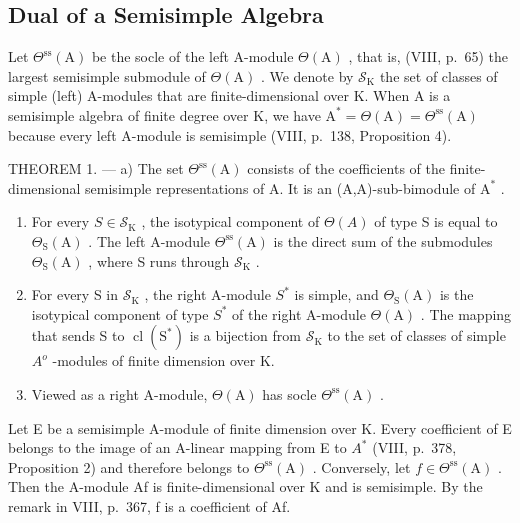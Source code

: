 \subsection{Dual of a Semisimple Algebra}

Let \(\Theta^{\mathrm{ss}}(\mathrm{A})\) be the socle of the left A-module \(\Theta (\mathrm{A})\) , that is, (VIII, p.~65) the largest semisimple submodule of \(\Theta (\mathrm{A})\) . We denote by \(\mathcal{S}_{\mathrm{K}}\) the set of classes of simple (left) A-modules that are finite-dimensional over K. When A is a semisimple algebra of finite degree over K, we have \(\mathrm{A}^{*} = \Theta (\mathrm{A}) = \Theta^{\mathrm{ss}}(\mathrm{A})\) because every left A-module is semisimple (VIII, p.~138, Proposition 4).

THEOREM 1. --- a) The set \(\Theta^{\mathrm{ss}}(\mathrm{A})\) consists of the coefficients of the finite-dimensional semisimple representations of A. It is an (A,A)-sub-bimodule of \(\mathrm{A}^*\) .

\begin{enumerate}
\def\labelenumi{\alph{enumi})}
\setcounter{enumi}{1}
\item
  For every \(S \in \mathcal{S}_{\mathrm{K}}\) , the isotypical component of \(\Theta(A)\) of type S is equal to \(\Theta_{\mathrm{S}}(\mathrm{A})\) . The left A-module \(\Theta^{\mathrm{ss}}(\mathrm{A})\) is the direct sum of the submodules \(\Theta_{\mathrm{S}}(\mathrm{A})\) , where S runs through \(\mathcal{S}_{\mathrm{K}}\) .
\item
  For every S in \(\mathcal{S}_{\mathrm{K}}\) , the right A-module \(S^{*}\) is simple, and \(\Theta_{\mathrm{S}}(\mathrm{A})\) is the isotypical component of type \(S^{*}\) of the right A-module \(\Theta(\mathrm{A})\) . The mapping that sends S to \(\operatorname{cl}(\mathrm{S}^{*})\) is a bijection from \(\mathcal{S}_{\mathrm{K}}\) to the set of classes of simple \(A^{o}\) -modules of finite dimension over K.
\item
  Viewed as a right A-module, \(\Theta (\mathrm{A})\) has socle \(\Theta^{\mathrm{ss}}(\mathrm{A})\) .
\end{enumerate}

Let E be a semisimple A-module of finite dimension over K. Every coefficient of E belongs to the image of an A-linear mapping from E to \(A^{*}\) (VIII, p.~378, Proposition 2) and therefore belongs to \(\Theta^{\mathrm{ss}}(\mathrm{A})\) . Conversely, let \(f \in \Theta^{\mathrm{ss}}(\mathrm{A})\) . Then the A-module Af is finite-dimensional over K and is semisimple. By the remark in VIII, p.~367, f is a coefficient of Af.

